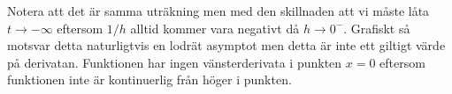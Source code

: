 \documentclass[a4paper, 11pt]{article}
\begin{document}
Notera att det är samma uträkning men med den skillnaden att vi måste
låta $t \rightarrow -\infty$ eftersom $1/h$ alltid kommer vara
negativt då $h\rightarrow 0^-$. Grafiskt så motsvar detta naturligtvis
en lodrät asymptot men detta är inte ett giltigt värde på
derivatan. Funktionen har ingen vänsterderivata i punkten $x = 0$
eftersom funktionen inte är kontinuerlig från höger i punkten.
\end{document}
